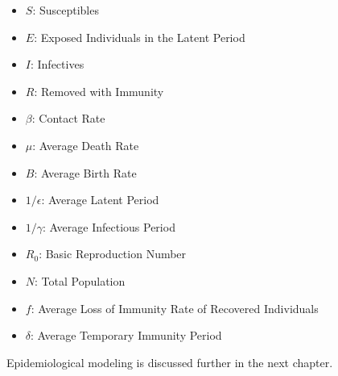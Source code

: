 \begin{itemize}
\item $S$: Susceptibles
\item $E$: Exposed Individuals in the Latent Period
\item $I$: Infectives
\item $R$: Removed with Immunity
\item $\beta$: Contact Rate
\item $\mu$: Average Death Rate
\item $B$: Average Birth Rate
\item $1/\epsilon$: Average Latent Period
\item $1/\gamma$: Average Infectious Period
\item $R_0$: Basic Reproduction Number
\item $N$: Total Population
\item $f$: Average Loss of Immunity Rate of Recovered Individuals
\item $\delta$: Average Temporary Immunity Period
\end{itemize}

Epidemiological modeling is discussed further in the next chapter.
